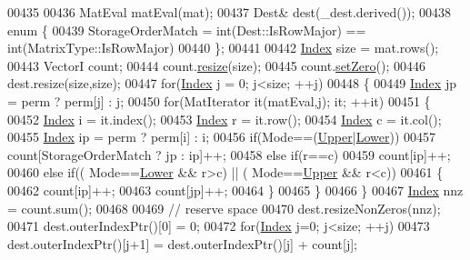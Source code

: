 \begin{DoxyCode}
00435   
00436   MatEval matEval(mat);
00437   Dest& dest(\_dest.derived());
00438   \textcolor{keyword}{enum} \{
00439     StorageOrderMatch = int(Dest::IsRowMajor) == int(MatrixType::IsRowMajor)
00440   \};
00441   
00442   \hyperlink{group___core___module_a554f30542cc2316add4b1ea0a492ff02}{Index} size = mat.rows();
00443   VectorI count;
00444   count.\hyperlink{class_eigen_1_1_plain_object_base_a99d9054ee2d5a40c6e00ded0265e9cea}{resize}(size);
00445   count.\hyperlink{class_eigen_1_1_plain_object_base_ac21ad5f989f320e46958b75ac8d9a1da}{setZero}();
00446   dest.resize(size,size);
00447   \textcolor{keywordflow}{for}(\hyperlink{group___core___module_a554f30542cc2316add4b1ea0a492ff02}{Index} j = 0; j<size; ++j)
00448   \{
00449     \hyperlink{group___core___module_a554f30542cc2316add4b1ea0a492ff02}{Index} jp = perm ? perm[j] : j;
00450     \textcolor{keywordflow}{for}(MatIterator it(matEval,j); it; ++it)
00451     \{
00452       \hyperlink{group___core___module_a554f30542cc2316add4b1ea0a492ff02}{Index} i = it.index();
00453       \hyperlink{group___core___module_a554f30542cc2316add4b1ea0a492ff02}{Index} r = it.row();
00454       \hyperlink{group___core___module_a554f30542cc2316add4b1ea0a492ff02}{Index} c = it.col();
00455       \hyperlink{group___core___module_a554f30542cc2316add4b1ea0a492ff02}{Index} ip = perm ? perm[i] : i;
00456       \textcolor{keywordflow}{if}(Mode==(\hyperlink{group__enums_gga39e3366ff5554d731e7dc8bb642f83cda6bcb58be3b8b8ec84859ce0c5ac0aaec}{Upper}|\hyperlink{group__enums_gga39e3366ff5554d731e7dc8bb642f83cda891792b8ed394f7607ab16dd716f60e6}{Lower}))
00457         count[StorageOrderMatch ? jp : ip]++;
00458       \textcolor{keywordflow}{else} \textcolor{keywordflow}{if}(r==c)
00459         count[ip]++;
00460       \textcolor{keywordflow}{else} \textcolor{keywordflow}{if}(( Mode==\hyperlink{group__enums_gga39e3366ff5554d731e7dc8bb642f83cda891792b8ed394f7607ab16dd716f60e6}{Lower} && r>c) || ( Mode==\hyperlink{group__enums_gga39e3366ff5554d731e7dc8bb642f83cda6bcb58be3b8b8ec84859ce0c5ac0aaec}{Upper} && r<c))
00461       \{
00462         count[ip]++;
00463         count[jp]++;
00464       \}
00465     \}
00466   \}
00467   \hyperlink{group___core___module_a554f30542cc2316add4b1ea0a492ff02}{Index} nnz = count.sum();
00468   
00469   \textcolor{comment}{// reserve space}
00470   dest.resizeNonZeros(nnz);
00471   dest.outerIndexPtr()[0] = 0;
00472   \textcolor{keywordflow}{for}(\hyperlink{group___core___module_a554f30542cc2316add4b1ea0a492ff02}{Index} j=0; j<size; ++j)
00473     dest.outerIndexPtr()[j+1] = dest.outerIndexPtr()[j] + count[j];

\end{DoxyCode}
